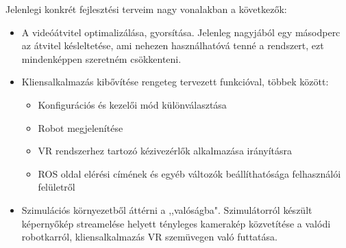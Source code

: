 \documentclass[11pt,a4paper,oneside]{article}
\begin{document}
Jelenlegi konkrét fejlesztési terveim nagy vonalakban a következők:
\begin{itemize}
  \item A videóátvitel optimalizálása, gyorsítása. Jelenleg nagyjából egy másodperc az átvitel késleltetése, ami nehezen használhatóvá tenné a rendszert, ezt mindenképpen szeretném csökkenteni.
  \item Kliensalkalmazás kibővítése rengeteg tervezett funkcióval, többek között:
  \begin{itemize}
    \item Konfigurációs és kezelői mód különválasztása
    \item Robot megjelenítése
    \item VR rendszerhez tartozó kézivezérlők alkalmazása irányításra
    \item ROS oldal elérési címének és egyéb változók beállíthatósága felhasználói felületről
  \end{itemize}
  \item Szimulációs környezetből áttérni a ,,valóságba". Szimulátorról készült képernyőkép streamelése helyett tényleges kamerakép közvetítése a valódi robotkarról, kliensalkalmazás VR szemüvegen való futtatása.
\end{itemize}
\end{document}
